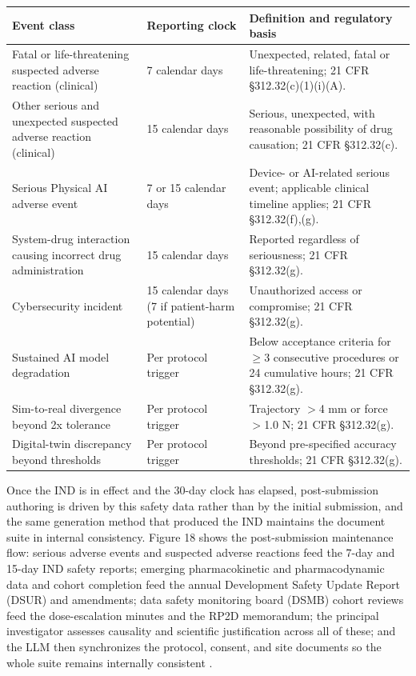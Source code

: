 \noindent\begin{tabularx}{\textwidth}{L{4.4cm} C{2.2cm} Y}
\toprule
\textbf{Event class} & \textbf{Reporting clock} & \textbf{Definition and regulatory basis} \\
\midrule
Fatal or life-threatening suspected adverse reaction (clinical) & 7 calendar days & Unexpected, related, fatal or life-threatening; 21 CFR \S 312.32(c)(1)(i)(A). \\
Other serious and unexpected suspected adverse reaction (clinical) & 15 calendar days & Serious, unexpected, with reasonable possibility of drug causation; 21 CFR \S 312.32(c). \\
Serious Physical AI adverse event & 7 or 15 calendar days & Device- or AI-related serious event; applicable clinical timeline applies; 21 CFR \S 312.32(f),(g). \\
System-drug interaction causing incorrect drug administration & 15 calendar days & Reported regardless of seriousness; 21 CFR \S 312.32(g). \\
Cybersecurity incident & 15 calendar days (7 if patient-harm potential) & Unauthorized access or compromise; 21 CFR \S 312.32(g). \\
Sustained AI model degradation & Per protocol trigger & Below acceptance criteria for $\geq$3 consecutive procedures or 24 cumulative hours; 21 CFR \S 312.32(g). \\
Sim-to-real divergence beyond 2x tolerance & Per protocol trigger & Trajectory $>$4 mm or force $>$1.0 N; 21 CFR \S 312.32(g). \\
Digital-twin discrepancy beyond thresholds & Per protocol trigger & Beyond pre-specified accuracy thresholds; 21 CFR \S 312.32(g). \\
\bottomrule
\end{tabularx}
\vspace*{-0.3cm}

Once the IND is in effect and the 30-day clock has elapsed, post-submission
authoring is driven by this safety data rather than by the initial submission, and
the same generation method that produced the IND maintains the document suite in
internal consistency. Figure 18 shows the post-submission maintenance flow:
serious adverse events and suspected adverse reactions feed the 7-day and 15-day
IND safety reports; emerging pharmacokinetic and pharmacodynamic data and cohort
completion feed the annual Development Safety Update Report (DSUR) and amendments;
data safety monitoring board (DSMB) cohort reviews feed the dose-escalation minutes
and the RP2D memorandum; the principal investigator assesses causality and
scientific justification across all of these; and the LLM then synchronizes the
protocol, consent, and site documents so the whole suite remains internally
consistent \cite{onpremwhippl, ichpaistduni}.

